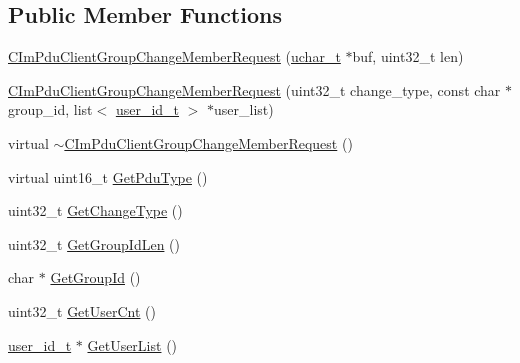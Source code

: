 \subsection*{Public Member Functions}
\begin{DoxyCompactItemize}
\item 
\hyperlink{class_c_im_pdu_client_group_change_member_request_a09f7b11d0dc77667c01a5454fa9bd265}{C\+Im\+Pdu\+Client\+Group\+Change\+Member\+Request} (\hyperlink{base_2ostype_8h_a124ea0f8f4a23a0a286b5582137f0b8d}{uchar\+\_\+t} $\ast$buf, uint32\+\_\+t len)
\item 
\hyperlink{class_c_im_pdu_client_group_change_member_request_a81e8577e67b2c1ea344af8e710c8804c}{C\+Im\+Pdu\+Client\+Group\+Change\+Member\+Request} (uint32\+\_\+t change\+\_\+type, const char $\ast$group\+\_\+id, list$<$ \hyperlink{structuser__id__t}{user\+\_\+id\+\_\+t} $>$ $\ast$user\+\_\+list)
\item 
virtual \hyperlink{class_c_im_pdu_client_group_change_member_request_abf2455e00660752f8a0e9b6a5ef68a5e}{$\sim$\+C\+Im\+Pdu\+Client\+Group\+Change\+Member\+Request} ()
\item 
virtual uint16\+\_\+t \hyperlink{class_c_im_pdu_client_group_change_member_request_a158b4067e6b624a77656df06cc6f911f}{Get\+Pdu\+Type} ()
\item 
uint32\+\_\+t \hyperlink{class_c_im_pdu_client_group_change_member_request_a053c67348299f264b7972cbf809beae7}{Get\+Change\+Type} ()
\item 
uint32\+\_\+t \hyperlink{class_c_im_pdu_client_group_change_member_request_a2aa2a87ae21a41f6c19b6b3d47cab968}{Get\+Group\+Id\+Len} ()
\item 
char $\ast$ \hyperlink{class_c_im_pdu_client_group_change_member_request_a86fe35a5bb20b62f6c46d3e3981222f6}{Get\+Group\+Id} ()
\item 
uint32\+\_\+t \hyperlink{class_c_im_pdu_client_group_change_member_request_aa3830bb24dea23d0c764109d34fa9eec}{Get\+User\+Cnt} ()
\item 
\hyperlink{structuser__id__t}{user\+\_\+id\+\_\+t} $\ast$ \hyperlink{class_c_im_pdu_client_group_change_member_request_a7375462a81a3f6eb86852f6d09572d42}{Get\+User\+List} ()
\end{DoxyCompactItemize}
